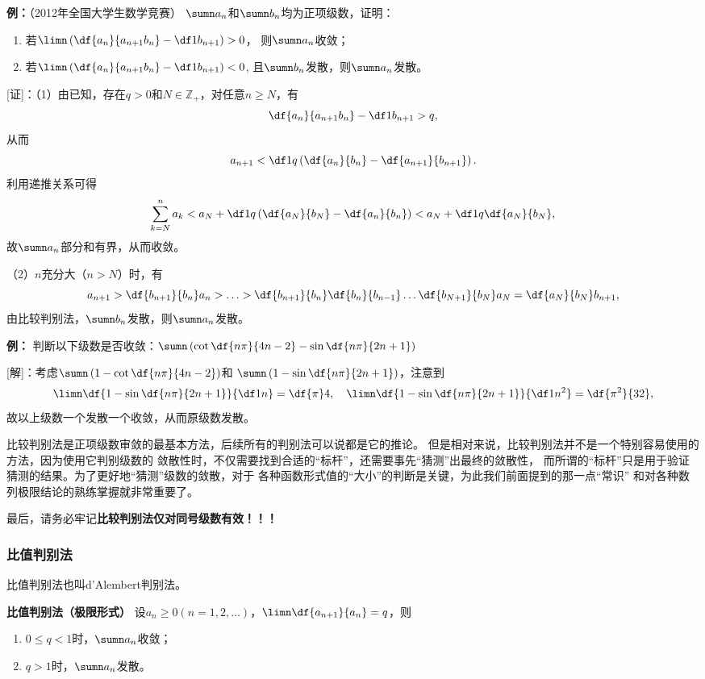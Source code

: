 {\bf 例：}（2012年全国大学生数学竞赛）
$\sumn a_n$和$\sumn b_n$均为正项级数，证明：
\begin{enumerate}[(1)]
  \setlength{\itemindent}{1cm}
  \item 若$\limn\left(\df{a_n}{a_{n+1}b_n}-\df 1{b_{n+1}}\right)>0$，
  则$\sumn a_n$收敛；
  \item 若$\limn\left(\df{a_n}{a_{n+1}b_n}-\df 1{b_{n+1}}\right)<0$,
  且$\sumn b_n$发散，则$\sumn a_n$发散。
\end{enumerate}

[证]：（1）由已知，存在$q>0$和$N\in\mathbb{Z}_+$，对任意$n\geq N$，有
$$\df{a_n}{a_{n+1}b_n}-\df 1{b_{n+1}}>q,$$
从而
$$a_{n+1}<\df1q\left(\df{a_n}{b_n}-\df{a_{n+1}}{b_{n+1}}\right).$$
利用递推关系可得
$$\sum\limits_{k=N}^na_k<a_N+\df1q\left(\df{a_N}{b_N}-\df{a_n}{b_n}\right)
<a_N+\df1q\df{a_N}{b_N},$$
故$\sumn a_n$部分和有界，从而收敛。

（2）$n$充分大（$n>N$）时，有
$$a_{n+1}>\df{b_{n+1}}{b_n}a_n>\ldots>
\df{b_{n+1}}{b_n}\df{b_{n}}{b_{n-1}}\ldots\df{b_{N+1}}{b_N}a_N
=\df{a_N}{b_N}b_{n+1},$$
由比较判别法，$\sumn b_n$发散，则$\sumn a_n$发散。\fin

{\bf 例：} 判断以下级数是否收敛：$\sumn\left(\cot\df{n\pi}{4n-2}-\sin\df{n\pi}{2n+1}\right)$

[解]：考虑$\sumn\left(1-\cot\df{n\pi}{4n-2}\right)$和
$\sumn\left(1-\sin\df{n\pi}{2n+1}\right)$，注意到
$$\limn\df{1-\sin\df{n\pi}{2n+1}}{\df1n}=\df{\pi}4,
\quad\limn\df{1-\sin\df{n\pi}{2n+1}}{\df1{n^2}}=\df{\pi^2}{32},$$
故以上级数一个发散一个收敛，从而原级数发散。\fin

比较判别法是正项级数审敛的最基本方法，后续所有的判别法可以说都是它的推论。
但是相对来说，比较判别法并不是一个特别容易使用的方法，因为使用它判别级数的
敛散性时，不仅需要找到合适的“标杆”，还需要事先“猜测”出最终的敛散性，
而所谓的“标杆”只是用于验证猜测的结果。为了更好地“猜测”级数的敛散，对于
各种函数形式值的“大小”的判断是关键，为此我们前面提到的那一点“常识”
和对各种数列极限结论的熟练掌握就非常重要了。

最后，请务必牢记{\bf\color{red}比较判别法仅对同号级数有效！！！}

\subsubsection{比值判别法}

比值判别法也叫{\kaishu d'Alembert判别法}。

\begin{thx}
	{\bf 比值判别法（极限形式）}
	设$a_n\geq 0(n=1,2,\ldots)$，$\limn\df{a_{n+1}}{a_n}=q$，则
	\begin{enumerate}
	  \item $0\leq q<1$时，$\sumn a_n$收敛； 
	  \item $q>1$时，$\sumn a_n$发散。
	\end{enumerate}
\end{thx}


